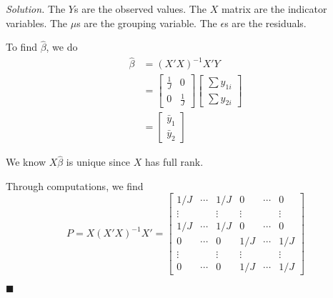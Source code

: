 \documentclass{article}
\begin{document}
\textit{Solution.} The \(Y\)s are the observed values. The \(X\) matrix are the indicator variables. The \(\mu\)s are the grouping variable. The \(\epsilon\)s are the residuals. 

To find \(\hat \beta\), we do
\begin{align*}
\hat \beta &= (X'X)^{-1}X'Y \\
&= \begin{bmatrix}
\frac1J & 0 \\
0 & \frac1J 
\end{bmatrix}
 \begin{bmatrix}
\sum y_{1i}\\
\sum y_{2i}
\end{bmatrix}\\
&=
 \begin{bmatrix}
\bar y_1 \\
\bar y_2
\end{bmatrix}
\end{align*}


We know \(X\hat\beta\) is unique since \(X\) has full rank. 

Through computations, we find 
\[
P = X(X'X)^{-1}X' =
\begin{bmatrix}
1/J & \cdots & 1/J & 0 &\cdots &0 \\
\vdots & & \vdots &\vdots & & \vdots \\
1/J & \cdots & 1/J & 0 &\cdots &0\\
 0 &\cdots &0 &1/J & \cdots & 1/J \\
 \vdots & & \vdots &\vdots & & \vdots \\
  0 &\cdots &0 &1/J & \cdots & 1/J 
\end{bmatrix}
\]




  \begin{flushright}
\(\blacksquare\)
\end{flushright} 
\end{document}
